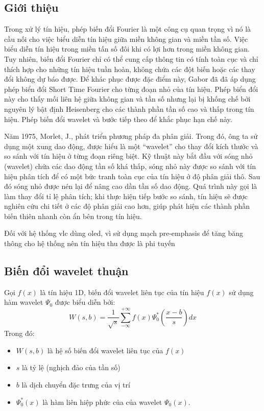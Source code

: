 \subsection{Giới thiệu}
Trong xử lý tín hiệu, phép biến đổi Fourier là một công cụ quan trọng vì nó là cầu nối cho việc biểu diễn tín hiệu giữa miền không gian và miền tần số. Việc biểu diễn tín hiệu trong miền tấn số đôi khi có lợi hơn trong miền không gian. Tuy nhiên, biến đổi Fourier chỉ có thể cung cấp thông tin có tính toàn cục và chỉ thích hợp cho những tín hiệu tuần hoàn, không chứa các đột biến hoặc các thay đổi không dự báo được. Để khác phục được đặc điểm này, Gabor đã đã áp dụng phép biển đổi Short Time Fourier cho từng đoạn nhỏ của tín hiệu. Phép biển đổi này cho thấy mối liên hệ giữa không gian và tần số nhưng lại bị khống chế bởi nguyên lý bật định Heisenberg cho các thành phần tần số cao và thấp trong tín hiệu. Phép biến đổi wavelet và bước tiếp theo để khắc phục hạn chế này.

Năm 1975, Morlet, J., phát triển phương pháp đa phân giải. Trong đó, ông ta sử dụng một xung dao động, được hiểu là một “wavelet” cho thay đổi kích thước và so sánh với tín hiệu ở từng đoạn riêng biệt.  Kỹ thuật này bắt đầu với sóng nhỏ (wavelet) chứa các dao  động tần số khá thấp, sóng nhỏ này được so sánh với tín hiệu phân tích để có một  bức tranh toàn cục của tín hiệu ở độ phân giải thô. Sau đó sóng nhỏ được nén lại để nâng cao dần tần số dao động. Quá trình này gọi là làm thay đổi tỉ lệ phân tích; khi thực hiện tiếp bước so sánh, tín hiệu sẽ được nghiên cứu chi tiết ở các độ phân giải cao hơn, giúp phát hiện các thành phần biến thiên nhanh còn ẩn bên trong 
tín hiệu. 

Đối với hệ thống \ac{vlc} dùng \ac{oled}, vì sử dụng mạch pre-emphasis để tăng băng thông cho hệ thống nên tín hiệu thu được là phi tuyến
\subsection{Biến đổi wavelet thuận}
Gọi $f(x)$ là tín hiệu 1D, biến đổi wavelet liên tục của tín hiệu $f(x)$ sử dụng hàm wavelet $\Psi_0$ được biểu diễn bởi:
\begin{equation}
W(s, b) = \frac{1}{\sqrt{s}} \sum_{-\infty}^{+\infty} f(x)\Psi_0^*(\frac{x-b}{s})dx
\end{equation}
Trong đó:
\begin{itemize}
	\item $W(s, b)$ là hệ số biến đổi wavelet liên tục của $f(x)$
	\item $s$ là tỷ lệ (nghịch đảo của tần số)
	\item $b$ là dịch chuyển đặc trưng của vị trí
	\item $\Psi_0^*(x)$ là hàm liên hiệp phức của của wavelet $\Psi_0(x)$.
\end{itemize}

